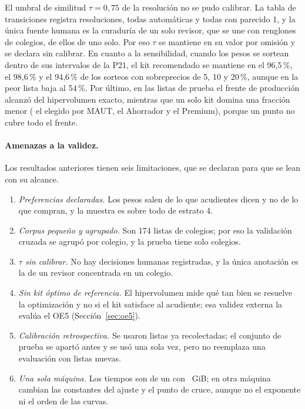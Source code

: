 El umbral de similitud $\tau=0{,}75$ de la resolución no se pudo calibrar. La tabla de transiciones
registra \calTauTransiciones{} resoluciones, todas automáticas y todas con parecido 1, y la única
fuente humana es la curaduría de un solo revisor, que se une con \calTauPares{} renglones de
\calTauColegios{} colegios, \calTauColegioMayor{} de ellos de uno solo. Por eso $\tau$ se mantiene en
su valor por omisión y se declara sin calibrar. En cuanto a la sensibilidad, cuando los pesos se
sortean dentro de sus intervalos de la P21, el kit recomendado se mantiene en el 96,5\,\%, el
98,6\,\% y el 94,6\,\% de los sorteos con sobreprecios de 5, 10 y 20\,\%, aunque en la peor lista baja
al 54\,\%. Por último, en las \calHVListas{} listas de prueba el frente de producción alcanzó
\calHVFrente{} del hipervolumen exacto, mientras que un solo kit domina una fracción menor
(\calHVMAUTPesos{} el elegido por MAUT, \calHVAhorrador{} el Ahorrador y \calHVPremium{} el
Premium), porque un punto no cubre todo el frente.

\paragraph{Amenazas a la validez.} Los resultados anteriores tienen seis limitaciones, que se
declaran para que se lean con su alcance.
\begin{enumerate}[label=\textbf{A\arabic*.},leftmargin=*,itemsep=1pt,topsep=2pt]
\item \emph{Preferencias declaradas.} Los pesos salen de lo que \calEncuestados{} acudientes dicen y
no de lo que compran, y la muestra es sobre todo de estrato 4.
\item \emph{Corpus pequeño y agrupado.} Son 174 listas de \calColegios{} colegios; por eso la
validación cruzada se agrupó por colegio, y la prueba tiene solo \calColegiosPrueba{} colegios.
\item \emph{$\tau$ sin calibrar.} No hay decisiones humanas registradas, y la única anotación es la
de un revisor concentrada en un colegio.
\item \emph{Sin kit óptimo de referencia.} El hipervolumen mide qué tan bien se resuelve la
optimización y no si el kit satisface al acudiente; esa validez externa la evalúa el OE5
(Sección~\ref{sec:oe5}).
\item \emph{Calibración retrospectiva.} Se usaron listas ya recolectadas; el conjunto de prueba se
apartó antes y se usó una sola vez, pero no reemplaza una evaluación con listas nuevas.
\item \emph{Una sola máquina.} Los tiempos son de un \calCPU{} con \calRAM~GiB; en otra máquina
cambian las constantes del ajuste y el punto de cruce, aunque no el exponente ni el orden de las
curvas.
\end{enumerate}

